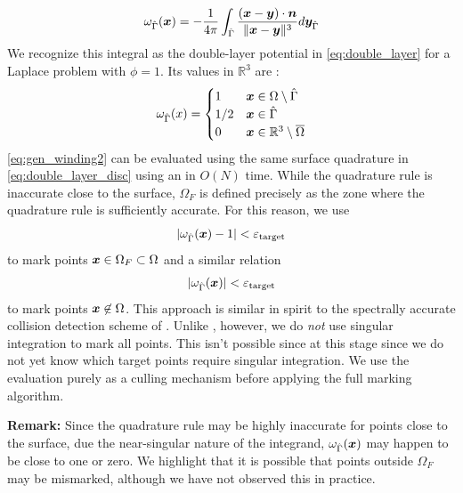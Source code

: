 \begin{equation}
  \omega_{\hat{\Gamma}}({\bm{x}}) = -\frac{1}{4\pi}\int_{\hat{\Gamma}} \frac{({\bm{x}} - {\bm{y}}) \cdot {\bm{n}}}{\|{\bm{x}} - {\bm{y}}\|^3} d{\bm{y}}_{\hat{\Gamma}}
  \label{eq:gen_winding2}
\end{equation}
We recognize this integral as the double-layer potential in \cref{eq:double_layer} for a Laplace problem with $\phi = 1$. 
Its values in $\mathbb{R}^3$ are  \cite{K}:
\begin{equation}
  \omega_{\hat{\Gamma}}(x) =
  \begin{cases}
    1 & {\bm{x}} \in \Omega \setminus \hat{\Gamma}\\
    1/2 & {\bm{x}} \in \hat{\Gamma}\\
    0 &  {\bm{x}} \in \mathbb{R}^3 \setminus \overline{\Omega}
  \end{cases}
  \label{eq:const-density}
\end{equation}
\cref{eq:gen_winding2} can be evaluated using the same surface quadrature in \cref{eq:double_layer_disc} using an \fmm in $O(N)$ time.
While the quadrature rule is inaccurate close to the surface, $\Omega_F$ is defined precisely as the zone where the quadrature rule is sufficiently accurate. 
For this reason, we use
\begin{equation}
  |\omega_{\hat{\Gamma}}({\bm{x}}) -1| < {\varepsilon_{\mathrm{target}}}
  \label{eq:marking-far}
\end{equation}
to mark points ${\bm{x}} \in \Omega_F \subset \Omega$ and a similar relation
\begin{equation}
  |\omega_{\hat{\Gamma}}({\bm{x}})| < {\varepsilon_{\mathrm{target}}}
  \label{eq:marking-out}
\end{equation}
to mark points ${\bm{x}} \not \in \Omega$.
This approach is similar in spirit to the spectrally accurate collision detection scheme of \cite[Section 3.5] {QB}.
Unlike \cite{QB}, however, we do \textit{not} use singular integration to mark all points. 
This isn't possible since at this stage since we do not yet know which target points require singular integration. 
We use the \fmm evaluation purely as a culling mechanism before applying the full marking algorithm.

\noindent\textbf{Remark:} Since the quadrature rule may be highly inaccurate for points close to the surface, due the near-singular nature of the integrand, $\omega_{\hat{\Gamma}}({\bm{x}})$ may happen to be close to one or zero. 
We highlight that it is possible that points outside $\Omega_F$ may be mismarked, although we have not observed this in practice. 

